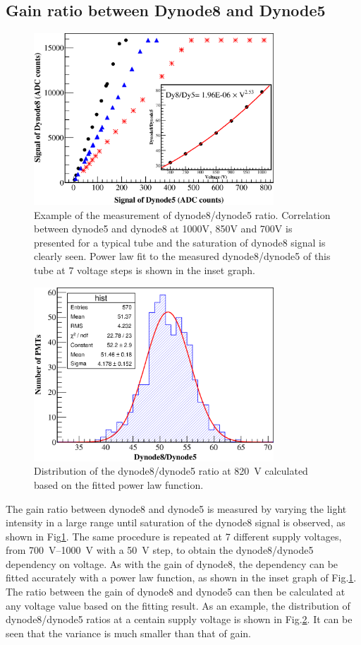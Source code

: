 \documentclass[preprint, times]{elsarticle}
\begin{document}
\subsection{Gain ratio between Dynode8 and Dynode5}
\label{sec:psd_dy58}

\begin{figure}[h!]
 \centering
 \includegraphics[width=90mm]{FIG10}
\caption{Example of the measurement of dynode8/dynode5 ratio.
Correlation between dynode5 and dynode8 at 1000V, 850V and 700V is presented for a typical tube and the saturation of dynode8 signal is clearly seen.
Power law fit to the measured dynode8/dynode5 of this tube at 7 voltage steps is shown in the inset graph.
}
\label{fig:FIG10}
\end{figure} 

\begin{figure}[h!]
 \centering
 \includegraphics[width=90mm]{FIG11}
\caption{Distribution of the dynode8/dynode5 ratio at \SI{820}{\volt} calculated based on the fitted power law function.}
\label{fig:FIG11}
\end{figure} 

The gain ratio between dynode8 and dynode5 is measured by varying the light intensity in a large range until saturation of the dynode8 signal is observed, as shown in Fig\ref{fig:FIG10}.
The same procedure is repeated at 7 different supply voltages, from \SIrange{700}{1000}{\volt} with a \SI{50}{\volt} step, to obtain the dynode8/dynode5 dependency on voltage.
As with the gain of dynode8, the dependency can be fitted accurately with a power law function, as shown in the inset graph of Fig.\ref{fig:FIG10}.
The ratio between the gain of dynode8 and dynode5 can then be calculated at any voltage value based on the fitting result.
As an example, the distribution of dynode8/dynode5 ratios at a centain supply voltage is shown in Fig.\ref{fig:FIG11}.
It can be seen that the variance is much smaller than that of gain.
\end{document}
